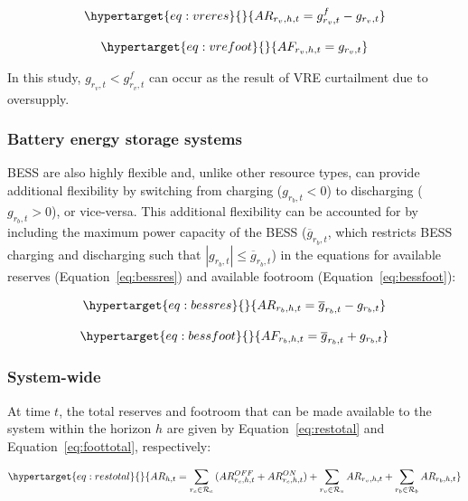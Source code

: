 \documentclass[12pt,a4paper,]{report}
\begin{document}
\begin{equation}\protect\hypertarget{eq:vreres}{}{ AR_{r_v,h,t}= g^f_{r_v,t}-g_{r_v,t}}\label{eq:vreres}\end{equation}

\begin{equation}\protect\hypertarget{eq:vrefoot}{}{ AF_{r_v,h,t}=g_{r_v,t}}\label{eq:vrefoot}\end{equation}

In this study, \(g_{r_v,t} < g^f_{r_v,t}\) can occur as the result of
VRE curtailment due to oversupply.

\hypertarget{sec:reserves-besscalc}{%
\subsubsection{Battery energy storage
systems}\label{sec:reserves-besscalc}}

BESS are also highly flexible and, unlike other resource types, can
provide additional flexibility by switching from charging
(\(g_{r_b, t} < 0\)) to discharging (\(g_{r_b,t} > 0\)), or vice-versa.
This additional flexibility can be accounted for by including the
maximum power capacity of the BESS (\(\overline{g}_{r_b,t}\), which
restricts BESS charging and discharging such that
\(|g_{r_b,t}| \leq \overline{g}_{r_b,t}\)) in the equations for
available reserves (Equation~\ref{eq:bessres}) and available footroom
(Equation~\ref{eq:bessfoot}):

\begin{equation}\protect\hypertarget{eq:bessres}{}{ AR_{r_b,h,t}=\overline{g}_{r_b,t}-g_{r_b,t}}\label{eq:bessres}\end{equation}

\begin{equation}\protect\hypertarget{eq:bessfoot}{}{ AF_{r_b,h,t}=\overline{g}_{r_b,t}+g_{r_b,t}}\label{eq:bessfoot}\end{equation}

\hypertarget{sec:reserves-syscalc}{%
\subsubsection{System-wide}\label{sec:reserves-syscalc}}

At time \(t\), the total reserves and footroom that can be made
available to the system within the horizon \(h\) are given by
Equation~\ref{eq:restotal} and Equation~\ref{eq:foottotal},
respectively:

\begin{equation}\protect\hypertarget{eq:restotal}{}{ AR_{h,t}=\sum_{r_c \in \mathcal{R}_c}{(AR_{r_c,h,t}^{OFF} + AR_{r_c,h,t}^{ON})} + \sum_{r_v \in \mathcal{R}_v}{AR_{r_v,h,t}} + \sum_{r_b \in \mathcal{R}_b}{AR_{r_b,h,t}} }\label{eq:restotal}\end{equation}
\end{document}
